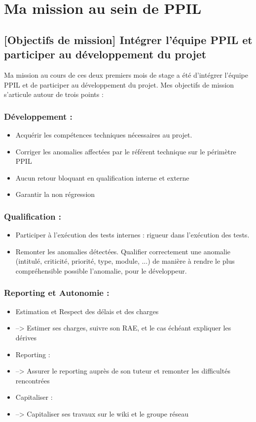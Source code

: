 \chapter{Ma mission au sein de PPIL}
\label{sec:unchapitre}
\section{[Objectifs de mission] Intégrer l'équipe PPIL et participer au développement du projet}
Ma mission au cours de ces deux premiers mois de stage a été d'intégrer l'équipe PPIL et de participer au développement du projet. Mes objectifs de mission s'articule autour de trois points :
\subsection{Développement :} 
\begin{itemize}
    \item Acquérir les compétences techniques nécessaires au projet.
    \item Corriger les anomalies affectées par le référent technique sur le périmètre PPIL 
    \item Aucun retour bloquant en qualification interne et externe 
    \item Garantir la non régression
\end{itemize}
\subsection{Qualification : } 
\begin{itemize}
    \item Participer à l'exécution des tests internes : rigueur dans l'exécution des tests.
    \item Remonter les anomalies détectées. Qualifier correctement une anomalie (intitulé, criticité, priorité, type, module, ...) de manière à rendre le plus compréhensible possible l'anomalie, pour le développeur.
\end{itemize}
\subsection{Reporting et Autonomie :} 
\begin{itemize}
    \item Estimation et Respect des délais et des charges
    \item --> Estimer ses charges, suivre son RAE, et le cas échéant expliquer les dérives 
    \item Reporting :
    \item --> Assurer le reporting auprès de son tuteur et remonter les difficultés rencontrées
    \item Capitaliser : 
    \item --> Capitaliser ses travaux sur le wiki et le groupe réseau
\end{itemize}
